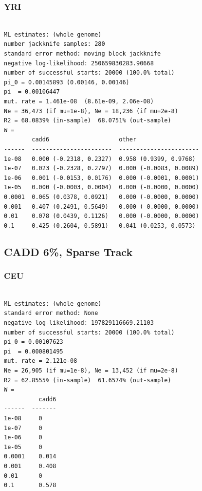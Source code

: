 \documentclass[11pt]{article}
\begin{document}
\subsubsection*{YRI}
\begin{minipage}{\linewidth}\begin{footnotesize}
\begin{verbatim}

ML estimates: (whole genome)
number jackknife samples: 280
standard error method: moving block jackknife
negative log-likelihood: 250659830283.90668
number of successful starts: 20000 (100.0% total)
pi_0 = 0.00145893 (0.00146, 0.00146)
pi  = 0.00106447
mut. rate = 1.461e-08  (8.61e-09, 2.06e-08)
Ne = 36,473 (if mu=1e-8), Ne = 18,236 (if mu=2e-8)
R2 = 68.0839% (in-sample)  68.0751% (out-sample)
W = 
        cadd6                    other
------  -----------------------  -----------------------
1e-08   0.000 (-0.2318, 0.2327)  0.958 (0.9399, 0.9768)
1e-07   0.023 (-0.2328, 0.2797)  0.000 (-0.0083, 0.0089)
1e-06   0.001 (-0.0153, 0.0176)  0.000 (-0.0001, 0.0001)
1e-05   0.000 (-0.0003, 0.0004)  0.000 (-0.0000, 0.0000)
0.0001  0.065 (0.0378, 0.0921)   0.000 (-0.0000, 0.0000)
0.001   0.407 (0.2491, 0.5649)   0.000 (-0.0000, 0.0000)
0.01    0.078 (0.0439, 0.1126)   0.000 (-0.0000, 0.0000)
0.1     0.425 (0.2604, 0.5891)   0.041 (0.0253, 0.0573)
\end{verbatim}
\end{footnotesize}\end{minipage}


\subsection{CADD 6\%, Sparse Track}
\subsubsection*{CEU}
\begin{minipage}{\linewidth}\begin{footnotesize}
\begin{verbatim}

ML estimates: (whole genome)
standard error method: None
negative log-likelihood: 197829116669.21103
number of successful starts: 20000 (100.0% total)
pi_0 = 0.00107623
pi  = 0.000801495
mut. rate = 2.121e-08 
Ne = 26,905 (if mu=1e-8), Ne = 13,452 (if mu=2e-8)
R2 = 62.8555% (in-sample)  61.6574% (out-sample)
W = 
          cadd6
------  -------
1e-08     0
1e-07     0
1e-06     0
1e-05     0
0.0001    0.014
0.001     0.408
0.01      0
0.1       0.578
\end{verbatim}
\end{footnotesize}\end{minipage}
\end{document}
